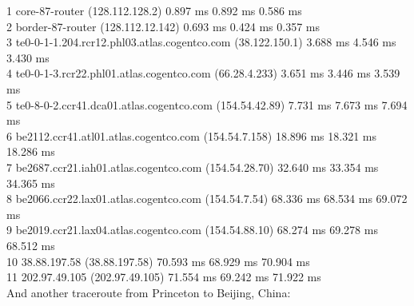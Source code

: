 \documentclass[titlepage, paper=a4, fontsize=11pt]{scrartcl} %
\numberwithin{equation}{section} %
\numberwithin{figure}{section} %
\numberwithin{table}{section} %
\begin{document}
1  core-87-router (128.112.128.2)  0.897 ms  0.892 ms  0.586 ms \\
2  border-87-router (128.112.12.142)  0.693 ms  0.424 ms  0.357 ms \\
3  te0-0-1-1.204.rcr12.phl03.atlas.cogentco.com (38.122.150.1)  3.688 ms  4.546 ms  3.430 ms \\
4  te0-0-1-3.rcr22.phl01.atlas.cogentco.com (66.28.4.233)  3.651 ms  3.446 ms 3.539 ms \\
5  te0-8-0-2.ccr41.dca01.atlas.cogentco.com (154.54.42.89)  7.731 ms  7.673 ms 7.694 ms \\
6  be2112.ccr41.atl01.atlas.cogentco.com (154.54.7.158)  18.896 ms  18.321 ms  18.286 ms \\
7  be2687.ccr21.iah01.atlas.cogentco.com (154.54.28.70)  32.640 ms 33.354 ms  34.365 ms \\
8  be2066.ccr22.lax01.atlas.cogentco.com (154.54.7.54)  68.336 ms  68.534 ms 69.072 ms \\
9  be2019.ccr21.lax04.atlas.cogentco.com (154.54.88.10)  68.274 ms  69.278 ms  68.512 ms \\
10  38.88.197.58 (38.88.197.58)  70.593 ms 68.929 ms 70.904 ms \\
11  202.97.49.105 (202.97.49.105)  71.554 ms  69.242 ms  71.922 ms
\\

And another traceroute from Princeton to Beijing, China: \\
\end{document}
